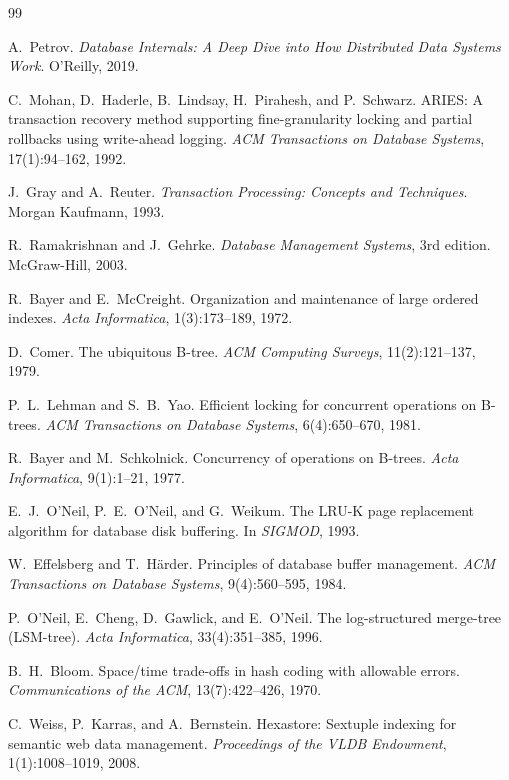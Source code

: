 \begin{thebibliography}{99}

 A.~Petrov. \emph{Database Internals: A Deep Dive into How Distributed Data Systems Work}. O'Reilly, 2019.

 C.~Mohan, D.~Haderle, B.~Lindsay, H.~Pirahesh, and P.~Schwarz. ARIES: A transaction recovery method supporting fine-granularity locking and partial rollbacks using write-ahead logging. \emph{ACM Transactions on Database Systems}, 17(1):94--162, 1992.

 J.~Gray and A.~Reuter. \emph{Transaction Processing: Concepts and Techniques}. Morgan Kaufmann, 1993.

 R.~Ramakrishnan and J.~Gehrke. \emph{Database Management Systems}, 3rd edition. McGraw-Hill, 2003.

 R.~Bayer and E.~McCreight. Organization and maintenance of large ordered indexes. \emph{Acta Informatica}, 1(3):173--189, 1972.

 D.~Comer. The ubiquitous B-tree. \emph{ACM Computing Surveys}, 11(2):121--137, 1979.

 P.~L.~Lehman and S.~B.~Yao. Efficient locking for concurrent operations on B-trees. \emph{ACM Transactions on Database Systems}, 6(4):650--670, 1981.

 R.~Bayer and M.~Schkolnick. Concurrency of operations on B-trees. \emph{Acta Informatica}, 9(1):1--21, 1977.

 E.~J.~O'Neil, P.~E.~O'Neil, and G.~Weikum. The LRU-K page replacement algorithm for database disk buffering. In \emph{SIGMOD}, 1993.

 W.~Effelsberg and T.~H\"arder. Principles of database buffer management. \emph{ACM Transactions on Database Systems}, 9(4):560--595, 1984.

 P.~O'Neil, E.~Cheng, D.~Gawlick, and E.~O'Neil. The log-structured merge-tree (LSM-tree). \emph{Acta Informatica}, 33(4):351--385, 1996.

 B.~H.~Bloom. Space/time trade-offs in hash coding with allowable errors. \emph{Communications of the ACM}, 13(7):422--426, 1970.

 C.~Weiss, P.~Karras, and A.~Bernstein. Hexastore: Sextuple indexing for semantic web data management. \emph{Proceedings of the VLDB Endowment}, 1(1):1008--1019, 2008.


\end{thebibliography}
